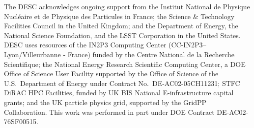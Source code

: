 % 
%
%
%
%
%
% 
%
The DESC acknowledges ongoing support from the Institut National de Physique Nucl\'eaire et de Physique des Particules in France; the Science \& Technology Facilities Council in the United Kingdom; and the Department of Energy, the National Science Foundation, and the LSST Corporation in the United States.  DESC uses resources of the IN2P3 Computing Center (CC-IN2P3--Lyon/Villeurbanne - France) funded by the Centre National de la Recherche Scientifique; the National Energy Research Scientific Computing Center, a DOE Office of Science User Facility supported by the Office of Science of the U.S.\ Department of Energy under Contract No.\ DE-AC02-05CH11231; STFC DiRAC HPC Facilities, funded by UK BIS National E-infrastructure capital grants; and the UK particle physics grid, supported by the GridPP Collaboration.  This work was performed in part under DOE Contract DE-AC02-76SF00515.
% 
% 
